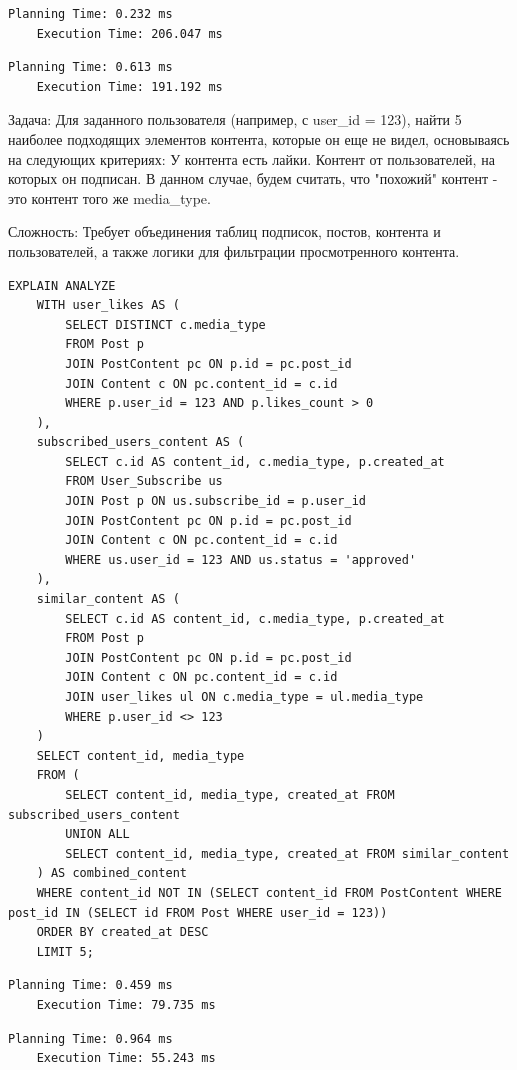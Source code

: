 \documentclass{article}
\begin{document}
\begin{lstlisting}[caption={explain analyze without indexes}, label={lst:example}]
    Planning Time: 0.232 ms
    Execution Time: 206.047 ms
\end{lstlisting}
\begin{lstlisting}[caption={explain analyze with indexes}, label={lst:example}]
    Planning Time: 0.613 ms
    Execution Time: 191.192 ms
\end{lstlisting}

Задача: Для заданного пользователя (например, с user\_id = 123), найти 5 наиболее подходящих элементов контента,
которые он еще не видел, основываясь на следующих критериях:
У контента есть лайки.
Контент от пользователей, на которых он подписан.
В данном случае, будем считать, что "похожий" контент - это контент того же media\_type.

Сложность: Требует объединения таблиц подписок, постов, контента и пользователей, 
а также логики для фильтрации просмотренного контента.
\begin{lstlisting}[caption={recomend}, label={lst:example}]
    EXPLAIN ANALYZE
    WITH user_likes AS (
        SELECT DISTINCT c.media_type
        FROM Post p
        JOIN PostContent pc ON p.id = pc.post_id
        JOIN Content c ON pc.content_id = c.id
        WHERE p.user_id = 123 AND p.likes_count > 0 
    ),
    subscribed_users_content AS (
        SELECT c.id AS content_id, c.media_type, p.created_at
        FROM User_Subscribe us
        JOIN Post p ON us.subscribe_id = p.user_id
        JOIN PostContent pc ON p.id = pc.post_id
        JOIN Content c ON pc.content_id = c.id
        WHERE us.user_id = 123 AND us.status = 'approved'
    ),
    similar_content AS (
        SELECT c.id AS content_id, c.media_type, p.created_at
        FROM Post p
        JOIN PostContent pc ON p.id = pc.post_id
        JOIN Content c ON pc.content_id = c.id
        JOIN user_likes ul ON c.media_type = ul.media_type
        WHERE p.user_id <> 123 
    )
    SELECT content_id, media_type
    FROM (
        SELECT content_id, media_type, created_at FROM subscribed_users_content
        UNION ALL
        SELECT content_id, media_type, created_at FROM similar_content
    ) AS combined_content
    WHERE content_id NOT IN (SELECT content_id FROM PostContent WHERE post_id IN (SELECT id FROM Post WHERE user_id = 123)) 
    ORDER BY created_at DESC
    LIMIT 5;
\end{lstlisting}
\begin{lstlisting}[caption={explain analyze without indexes}, label={lst:example}]
    Planning Time: 0.459 ms
    Execution Time: 79.735 ms
\end{lstlisting}
\begin{lstlisting}[caption={explain analyze with indexes}, label={lst:example}]
    Planning Time: 0.964 ms
    Execution Time: 55.243 ms
\end{lstlisting}
\end{document}
